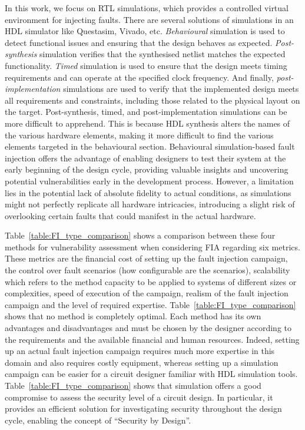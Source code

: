 In this work, we focus on RTL simulations, which provides a controlled virtual environment for injecting faults. There are several solutions of simulations in an HDL simulator like Questasim, Vivado, etc. \textit{Behavioural} simulation is used to detect functional issues and ensuring that the design behaves as expected. \textit{Post-synthesis} simulation verifies that the synthesised netlist matches the expected functionality. \textit{Timed} simulation is used to ensure that the design meets timing requirements and can operate at the specified clock frequency. And finally, \textit{post-implementation} simulations are used to verify that the implemented design meets all requirements and constraints, including those related to the physical layout on the target.
Post-synthesis, timed, and post-implementation simulations can be more difficult to apprehend. This is because HDL synthesis alters the names of the various hardware elements, making it more difficult to find the various elements targeted in the behavioural section.
Behavioural simulation-based fault injection offers the advantage of enabling designers to test their system at the early beginning of the design cycle, providing valuable insights and uncovering potential vulnerabilities early in the development process. However, a limitation lies in the potential lack of absolute fidelity to actual conditions, as simulations might not perfectly replicate all hardware intricacies, introducing a slight risk of overlooking certain faults that could manifest in the actual hardware.

Table~\ref{table:FI_type_comparison} shows a comparison between these four methods for vulnerability assessment when considering FIA regarding six metrics. These metrics are the financial cost of setting up the fault injection campaign, the control over fault scenarios (how configurable are the scenarios), scalability which refers to the method capacity to be applied to systems of different sizes or complexities, speed of execution of the campaign, realism of the fault injection campaign and the level of required expertise.
Table~\ref{table:FI_type_comparison} shows that no method is completely optimal. Each method has its own advantages and disadvantages and must be chosen by the designer according to the requirements and the available financial and human resources. Indeed, setting up an actual fault injection campaign requires much more expertise in this domain and also requires costly equipment, whereas setting up a simulation campaign can be easier for a circuit designer familiar with HDL simulation tools.
Table~\ref{table:FI_type_comparison} shows that simulation offers a good compromise to assess the security level of a circuit design. In particular, it provides an efficient solution for investigating security throughout the design cycle, enabling the concept of “Security by Design”.

